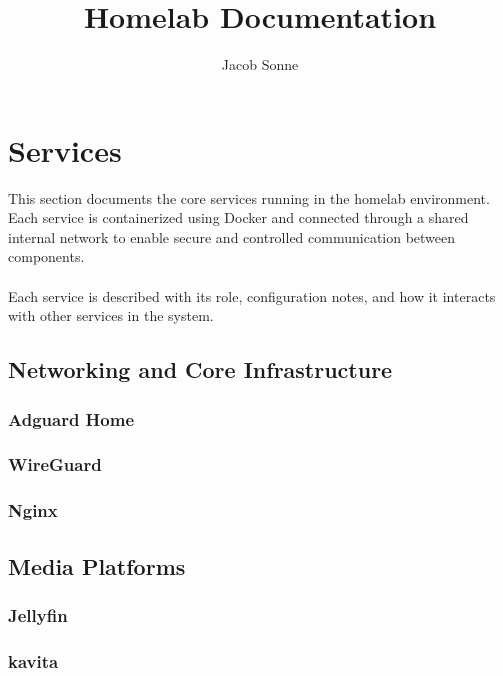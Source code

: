 \documentclass{article}
\title{Homelab Documentation}
\author{Jacob Sonne}
\begin{document}
\maketitle

\tableofcontents
\newpage

\section{Services}
This section documents the core services running in the homelab environment. Each service is containerized using Docker and connected through a shared internal network to enable secure and controlled communication between components.
\\\\
Each service is described with its role, configuration notes, and how it interacts with other services in the system.
\subsection{Networking and Core Infrastructure}
\subsubsection{Adguard Home}


\subsubsection{WireGuard}


\subsubsection{Nginx}


\subsection{Media Platforms}
\subsubsection{Jellyfin}

\subsubsection{kavita}

\end{document}
